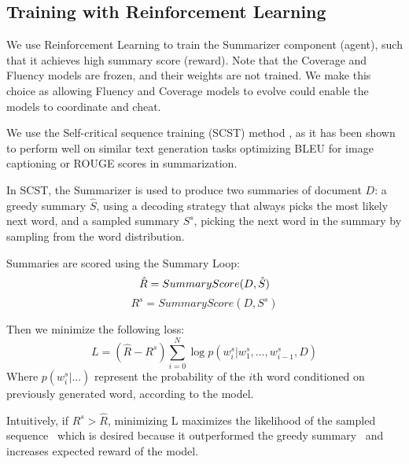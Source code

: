 \documentclass[11pt,a4paper]{article}
\begin{document}
\subsection{Training with Reinforcement Learning}
We use Reinforcement Learning to train the Summarizer component (agent), such that it achieves high summary score (reward). Note that the Coverage and Fluency models are frozen, and their weights are not trained. We make this choice as allowing Fluency and Coverage models to evolve could enable the models to coordinate and cheat.

We use the Self-critical sequence training (SCST) method \cite{rennie2017self}, as it has been shown to perform well on similar text generation tasks optimizing BLEU for image captioning or ROUGE scores in summarization.

In SCST, the Summarizer is used to produce two summaries of document $D$: a greedy summary $\hat{S}$, using a decoding strategy that always picks the most likely next word, and a sampled summary $S^s$, picking the next word in the summary by sampling from the word distribution.

Summaries are scored using the Summary Loop:
\[
    \vspace{-1em}
    \hat{R} = SummaryScore(D,\hat{S})
\]
\[
    R^s = SummaryScore(D,S^s)
\]

Then we minimize the following loss:
$$L = (\hat{R} - R^s) \sum_{i=0}^{N} \log p(w_i^s | w_1^s, ..., w_{i-1}^s, D)$$
Where $p(w_i^s | ...)$ represent the probability of the $i$th word conditioned on previously generated word, according to the model.

Intuitively, if $R^s > \hat{R}$, minimizing L maximizes the likelihood of the sampled sequence \textemdash~which is desired because it outperformed the greedy summary \textemdash~and increases expected reward of the model. 
\end{document}
